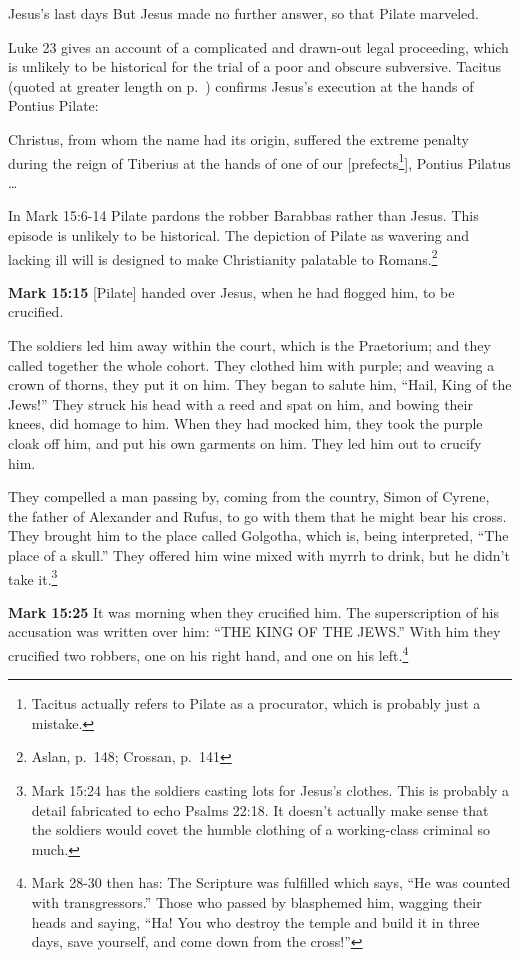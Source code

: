 \documentclass[10pt,twoside]{article} %
\newcommand{\doimage}[2]{\texttt{[image: \#2]}\label{fig:#2}}
\newcommand{\figbasic}[4]{ %
    \ifthenelse{\isodd{\pageref{fig:#2}}}{}{\hfill}
    \ifstrempty{#3}{
      \doimage{#1}{#2}
    }{
      \makebox{\doimage{#1}{#2} \\ #3}
    }
    \ifthenelse{\isodd{\pageref{fig:#2}}}{\hfill}{}
    \par
}
\newcommand{\fig}[2][0.4]{
  \figbasic{#1}{#2}{}{}
}
\newcommand{\quotesize}{\normalsize{}}
\newcommand{\comm}[1]{\begingroup \color{black!50} #1\endgroup}
\newenvironment{quotetext}{\begingroup\quotesize}{\endgroup}
\newcommand{\intex}[1]{\index[texts]{#1}}
\newcommand{\reftex}[1]{#1\intex{#1}}
\newcommand{\bible}[2]{\begin{quotetext}\textbf{#1}\intex{#1} #2\end{quotetext}}
\newcommand{\gospelmark}[2]{\bible{Mark #1}{#2}}
\begin{document}
\begin{section}{Jesus's last days}
{  But Jesus made no further answer, so that Pilate marveled. 
}

\comm{\reftex{Luke 23} gives an account of a complicated and drawn-out legal proceeding, which is unlikely to be
historical for the trial of a poor and obscure subversive.
Tacitus (quoted at greater length on p.~\pageref{tacitus}) confirms
Jesus's execution at the hands of Pontius Pilate:}

\begin{quotetext}
Christus, from whom the name had its origin, suffered
the extreme penalty during the reign of Tiberius at the hands of one
of our [prefects\footnote{Tacitus actually refers to Pilate as a procurator, which is probably just a mistake.}], Pontius Pilatus \ldots
\end{quotetext}


\comm{In Mark 15:6-14 Pilate pardons the robber Barabbas rather than Jesus. This episode is unlikely to be historical.
The depiction of Pilate as wavering and lacking ill will is designed to make Christianity palatable to Romans.\footnote{Aslan, p.~148; Crossan,
p.~141}}

\fig{ecce-homo}

\gospelmark{15:15}{
[Pilate] handed over Jesus, when he had flogged him, to be crucified.

  The soldiers led him away within the court, which is the Praetorium; and they called together the whole cohort.   They clothed him with purple; and weaving a crown of thorns, they put it on him.   They began to salute him, ``Hail, King of the Jews!''   They struck his head with a reed and spat on him, and bowing their knees, did homage to him.   When they had mocked him, they took the purple cloak off him, and put his own garments on him. They led him out to crucify him.

  They compelled a man passing by, coming from the country, Simon of Cyrene, the father of Alexander and Rufus, to go with them that he might bear his cross.   They brought him to the place called Golgotha, which is, being interpreted, ``The place of a skull.''   They offered him wine mixed with myrrh to drink, but he didn't take it.\footnote{\reftex{Mark 15:24} has the soldiers casting lots for Jesus's clothes. This is probably a detail fabricated
to echo \reftex{Psalms 22:18}. It doesn't actually make sense that the soldiers would covet the humble clothing of a working-class criminal so much.}
}

\gospelmark{15:25}{
It was morning when they crucified him.   The superscription of his accusation was written over him: ``THE KING OF THE JEWS.''   With him they crucified two robbers, one on his right hand, and one on his left.\footnote{Mark 28-30 then has: The Scripture was fulfilled which says, 
``He was counted with transgressors.'' Those who passed by blasphemed him, wagging their heads and saying, ``Ha! You who destroy the temple and build it in three days,   save yourself, and come down from the cross!''}
}


\end{section}
\end{document}

